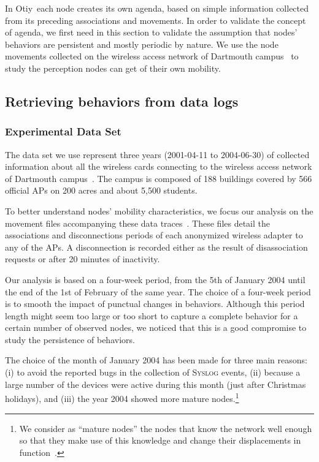 \documentclass[a4paper]{sig-alternate-10pt}
\newcommand{\otiy}{{\sffamily Otiy}}
\begin{document}
In \otiy\, each node creates its own agenda, based on simple
information collected from its preceding associations and movements.
In order to validate the concept of agenda, we first need in this
section to validate the assumption that nodes' behaviors are
persistent and mostly periodic by nature. We use the node movements
collected on the wireless access network of Dartmouth
campus~\cite{dartmouth-campus-movement-2005-03-08} to study the
perception nodes can get of their own mobility.

\subsection{Retrieving behaviors from data logs}

\subsubsection{Experimental Data Set}

The data set we use represent three years (2001-04-11 to 2004-06-30)
of collected information about all the wireless cards connecting to
the wireless access network of Dartmouth
campus~\cite{dartmouth-campus-syslog}. The campus is
composed of 188 buildings covered by 566 official APs on 200 acres
and about 5,500 students.

To better understand nodes' mobility characteristics, we focus our
analysis on the movement files accompanying these data
traces~\cite{dartmouth-campus-movement-2005-03-08}. These files
detail the associations and disconnections periods of each
anonymized wireless adapter to any of the APs.  A disconnection is
recorded either as the result of disassociation requests or after 20
minutes of inactivity.

Our analysis is based on a four-week period, from the 5th of January
2004 until the end of the 1st of February of the same year. The
choice of a four-week period is to smooth the impact of punctual
changes in behaviors. Although this period length might seem too
large or too short to capture a complete behavior for a certain
number of observed nodes, we noticed that this is a good compromise
to study the persistence of behaviors.

The choice of the month of January 2004 has been made for three main
reasons: (i) to avoid the reported bugs in the collection of
\textsc{Syslog} events, (ii) because a large number of the devices
were active during this month (just after Christmas holidays), and
(iii) the year 2004 showed more mature nodes.\footnote{We
consider as ``mature nodes'' the nodes that know the network
well enough so that they make use of this knowledge and change their
displacements in function~\cite{henders_usage}.}
\end{document}
